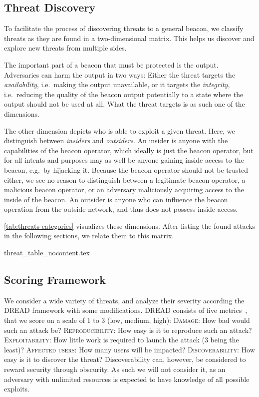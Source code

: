 \subsection{Threat Discovery}
To facilitate the process of discovering threats to a general beacon, we classify threats as they are found in a two-dimensional matrix.
This helps us discover and explore new threats from multiple sides.

The important part of a beacon that must be protected is the output.
Adversaries can harm the output in two ways:
Either the threat targets the \emph{availability}, i.e.\ making the output unavailable, or it targets the \emph{integrity}, i.e.\ reducing the quality of the beacon output potentially to a state where the output should not be used at all.
What the threat targets is as such one of the dimensions.

The other dimension depicts who is able to exploit a given threat.
Here, we distinguish between \emph{insiders} and \emph{outsiders}.
An insider is anyone with the capabilities of the beacon operator, which ideally is just the beacon operator, but for all intents and purposes may as well be anyone gaining inside access to the beacon, e.g.\ by hijacking it.
Because the beacon operator should not be trusted either, we see no reason to distinguish between a legitimate beacon operator, a malicious beacon operator, or an adversary maliciously acquiring access to the inside of the beacon.
An outsider is anyone who can influence the beacon operation from the outside network, and thus does not possess inside access.

\cref{tab:threats-categories} visualizes these dimensions.
After listing the found attacks in the following sections, we relate them to this matrix.

{threat_table_nocontent.tex}

\subsection{Scoring Framework}
We consider a wide variety of threats, and analyze their severity according the DREAD framework with some modifications.
DREAD consists of five metrics~\cite{dread}, that we score on a scale of 1 to 3 (low, medium, high):
\textsc{Damage}: How bad would such an attack be?
\textsc{Reproducibility}: How easy is it to reproduce such an attack?
\textsc{Exploitability}: How little work is required to launch the attack (3 being the least)?
\textsc{Affected users}: How many users will be impacted?
\textsc{Discoverability}: How easy is it to discover the threat?
Discoverability can, however, be considered to reward security through obscurity.
As such we will not consider it, as an adversary with unlimited resources is expected to have knowledge of all possible exploits.

